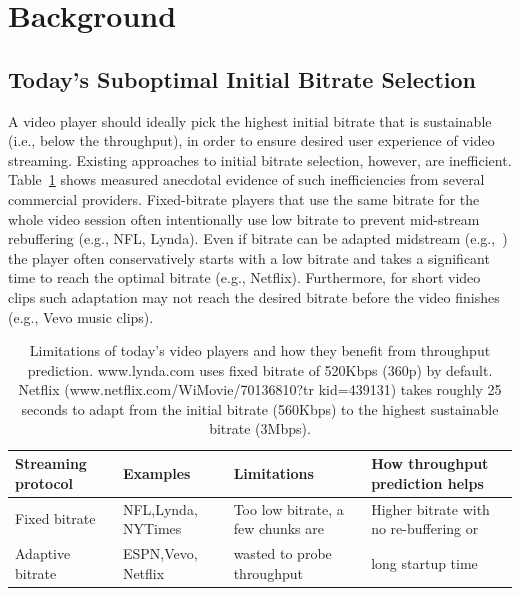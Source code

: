 \section{Background}
\label{sec:dda:back}

\subsection{Today's Suboptimal Initial Bitrate Selection}

A video player should ideally pick the highest initial bitrate
that is sustainable (i.e., below the throughput), in order to ensure desired user experience of video
streaming. Existing approaches to initial bitrate selection, however, are
inefficient. Table~\ref{tab:video} shows measured anecdotal evidence of such
inefficiencies from several commercial providers.  Fixed-bitrate players that
use the same bitrate for the whole video session often intentionally use low
bitrate to prevent mid-stream rebuffering (e.g., NFL, Lynda). Even if bitrate
can be adapted midstream (e.g.,~\cite{dash,netflix,festive}) the player often
conservatively starts with a low bitrate and takes a significant time to reach
the optimal bitrate (e.g., Netflix).  Furthermore, for short video clips such
adaptation may not reach the desired bitrate before the video finishes (e.g., Vevo music clips).

\begin{table}[t!]
    \begin{tabular}{p{3cm}|p{}|p{3.2cm}|p{}}
    {\bf Streaming protocol}   & {\bf Examples} & {\bf Limitations} & {\bf How throughput prediction helps} \\ \hline\hline
    Fixed bitrate & NFL,Lynda, NYTimes        & Too low bitrate, a few chunks are & Higher bitrate with no re-buffering or \\ \cline{1-2}
    Adaptive bitrate & ESPN,Vevo, Netflix      &  wasted to probe throughput & long startup time
    \end{tabular}
\caption{Limitations of today's video players and how they benefit from throughput prediction.
www.lynda.com  uses fixed bitrate of 520Kbps (360p) by default.  Netflix (www.netflix.com/WiMovie/70136810?tr kid=439131) takes roughly 25 seconds to adapt from the initial bitrate (560Kbps) to the highest sustainable bitrate (3Mbps).}
\label{tab:video}
\end{table}

